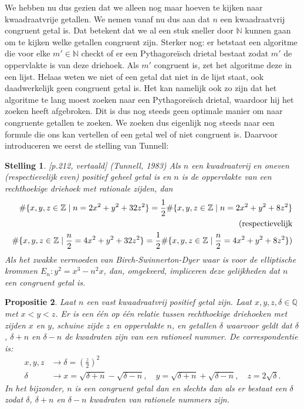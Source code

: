 \documentclass[12pt,reqno]{article}
\newcommand*{\NN}{\ensuremath{\mathbb{N}}}
\newcommand*{\ZZ}{\ensuremath{\mathbb{Z}}}
\newcommand*{\QQ}{\ensuremath{\mathbb{Q}}}
\theoremstyle{theorem}
\newtheorem{theorem}{Stelling}
\newtheorem{proposition}[theorem]{Propositie}
\theoremstyle{definition}
\begin{document}
	We hebben nu dus gezien dat we alleen nog maar hoeven te kijken naar kwaadraatvrije getallen. We nemen vanaf nu dus aan dat $n$ een kwaadraatvrij congruent getal is. Dat betekent dat we al een stuk sneller door $\NN$ kunnen gaan om te kijken welke getallen congruent zijn. Sterker nog: er betstaat een algoritme die voor elke $m'\in\NN$ checkt of er een Pythagore\"isch drietal bestaat zodat $m'$ de oppervlakte is van deze driehoek. Als $m'$ congruent is, zet het algoritme deze in een lijst. Helaas weten we niet of een getal dat niet in de lijst staat, ook daadwerkelijk geen congruent getal is. Het kan namelijk ook zo zijn dat het algoritme te lang moest zoeken naar een Pythagore\"isch drietal, waardoor hij het zoeken heeft afgebroken. Dit is dus nog steeds geen optimale manier om naar congruente getallen te zoeken. We zoeken dus eigenlijk nog steeds naar een formule die ons kan vertellen of een getal wel of niet congruent is. Daarvoor introduceren we eerst de stelling van Tunnell:
	\begin{theorem}
		\cite{Koblitz}[p.212, vertaald] (Tunnell, 1983) Als $n$ een kwadraatvrij en oneven (respectievelijk even) positief geheel getal is en $n$ is de oppervlakte van een rechthoekige driehoek met rationale zijden, dan
		\begin{align}
		\#\{x,y,z\in\ZZ \mid n=2x^2+y^2+32z^2\} = \frac{1}{2} \#\{x,y,z\in\ZZ \mid n=2x^2+y^2+8z^2\}\\
		\notag \text{(respectievelijk} \\
		\#\{x,y,z\in\ZZ \mid \frac{n}{2}=4x^2+y^2+32z^2\} = \frac{1}{2} \#\{x,y,z\in\ZZ \mid \frac{n}{2}=4x^2+y^2+8z^2\})
		\end{align}
		Als het zwakke vermoeden van Birch-Swinnerton-Dyer waar is voor de elliptische krommen $E_n:y^2=x^3-n^2x$, dan, omgekeerd, impliceren deze gelijkheden dat $n$ een congruent getal is.
	\end{theorem}
	
	\begin{proposition}
		Laat $n$ een vast kwaadraatvrij positief getal zijn. Laat $x,y,z,\delta \in\QQ$ met $x<y<z$. Er is een \'e\'en op \'e\'en relatie tussen rechthoekige driehoeken met zijden $x$ en $y$, schuine zijde $z$ en oppervlakte $n$, en getallen $\delta$ waarvoor geldt dat $\delta$, $\delta +n$ en $\delta -n$ de kwadraten zijn van een rationeel nummer. De correspondentie is:
		\begin{align}
			x,y,z &\rightarrow \delta = \left( \frac{z}{2} \right)^2 \\
			\delta &\rightarrow x=\sqrt{\delta+n} - \sqrt{\delta-n},\quad y = \sqrt{\delta+n}+\sqrt{\delta-n},\quad z = 2\sqrt{\delta}.
		\end{align}
		In het bijzonder, $n$ is een congruent getal dan en slechts dan als er bestaat een $\delta$ zodat $\delta$, $\delta+n$ en $\delta-n$ kwadraten van rationele nummers zijn.
	\end{proposition}
	
\end{document}
